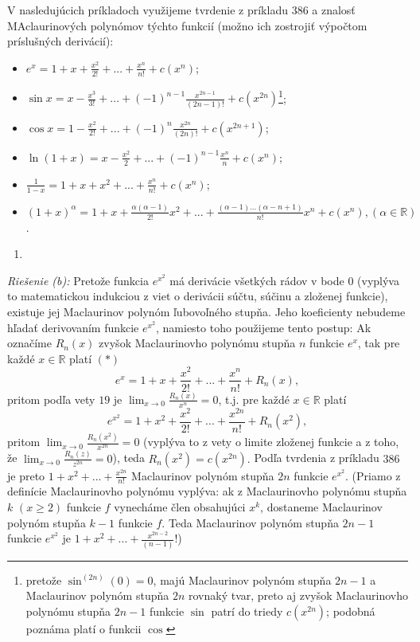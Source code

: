 V nasledujúcich príkladoch využijeme tvrdenie z príkladu $386$ a znalosť MAclaurinových polynómov týchto funkcií (možno ich zostrojiť výpočtom príslušných derivácií):
\begin{itemize}
\item $e^x=1+x+\frac{x^2}{2!}+...+\frac{x^n}{n!}+c(x^n)$;
\item $\sin x=x-\frac{x^3}{3!}+...+(-1)^{n-1}\frac{x^{2n-1}}{(2n-1)!}+c(x^{2n})$\footnote{pretože $\sin^{(2n)}(0)=0$, majú Maclaurinov polynóm stupňa $2n-1$ a Maclaurinov polynóm stupňa $2n$ rovnaký tvar, preto aj zvyšok Maclaurinovho polynómu stupňa $2n-1$ funkcie $\sin$ patrí do triedy $c(x^{2n})$; podobná poznáma platí o funkcii $\cos$};
\item $\cos x=1-\frac{x^2}{2!}+...+(-1)^{n}\frac{x^{2n}}{(2n)!}+c(x^{2n+1})$;
\item $\ln (1+x)=x-\frac{x^2}{2}+...+(-1)^{n-1}\frac{x^n}{n}+c(x^n)$;
\item $\frac{1}{1-x}=1+x+x^2+...+\frac{x^n}{n!}+c(x^n)$;
\item $(1+x)^{\alpha}=1+x+\frac{\alpha(\alpha-1)}{2!}x^2+...+\frac{(\alpha-1)...(\alpha-n+1)}{n!}x^n+c(x^n),(\alpha\in\mathbb{R})$.
\end{itemize}

\begin{enumerate}[resume]
	\item {}
\end{enumerate}

\textit{Riešenie (b):}
Pretože funkcia $e^{x^2}$ má derivácie všetkých rádov v bode $0$ (vyplýva to matematickou indukciou z viet o derivácii súčtu, súčinu a zloženej funkcie), existuje jej Maclaurinov polynóm ľubovoľného stupňa. Jeho koeficienty nebudeme hľadať derivovaním funkcie $e^{x^2}$, namiesto toho použijeme tento postup:
Ak označíme $R_n(x)$ zvyšok Maclaurinovho polynómu stupňa $n$ funkcie $e^x$, tak pre každé $x\in\mathbb{R}$ platí $(*)$
$$e^x=1+x+\frac{x^2}{2!}+...+\frac{x^n}{n!}+R_n(x),$$
pritom podľa vety $19$ je $\lim_{x\rightarrow 0}\frac{R_n(x)}{x^n}=0$, t.j. pre každé $x\in\mathbb{R}$ platí
$$e^{x^2}=1+x^2+\frac{x^2}{2!}+...+\frac{x^{2n}}{n!}+R_n(x^2),$$
pritom $\lim_{x\rightarrow 0}\frac{R_n(x^2)}{x^{2n}}=0$ (vyplýva to z vety o limite zloženej funkcie a z toho, že $\lim_{x\rightarrow 0}\frac{R_n(z)}{z^{2n}}=0$), teda $R_n(x^2)=c(x^{2n}).$ Podľa tvrdenia z príkladu $386$ je preto $1+x^2+...+\frac{x^{2n}}{n!}$ Maclaurinov polynóm stupňa $2n$ funkcie $e^{x^2}$.
(Priamo z definície Maclaurinovho polynómu vyplýva: ak z Maclaurinovho polynómu stupňa $k$ $(x\geq 2)$ funkcie $f$ vynecháme člen obsahujúci $x^k$, dostaneme Maclaurinov polynóm stupňa $k-1$ funkcie $f$. Teda Maclaurinov polynóm stupňa $2n-1$ funkcie $e^{x^2}$ je $1+x^2+...+\frac{x^{2n-2}}{(n-1)}$!)

